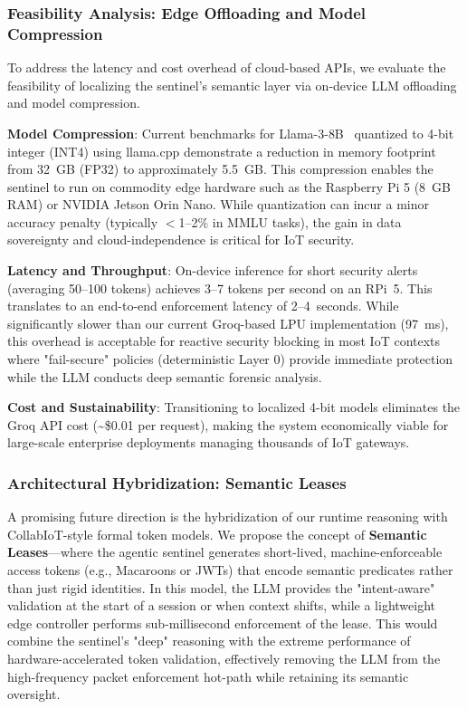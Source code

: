 \documentclass[conference]{IEEEtran}
\begin{document}
\subsubsection{Feasibility Analysis: Edge Offloading and Model Compression}

To address the latency and cost overhead of cloud-based APIs, we evaluate the feasibility of localizing the sentinel's semantic layer via on-device LLM offloading and model compression. 

\textbf{Model Compression}: Current benchmarks for Llama-3-8B~\cite{llama3} quantized to 4-bit integer (INT4) using llama.cpp demonstrate a reduction in memory footprint from 32~GB (FP32) to approximately 5.5~GB. This compression enables the sentinel to run on commodity edge hardware such as the Raspberry Pi 5 (8~GB RAM) or NVIDIA Jetson Orin Nano. While quantization can incur a minor accuracy penalty (typically $<$1–2\% in MMLU tasks), the gain in data sovereignty and cloud-independence is critical for IoT security.

\textbf{Latency and Throughput}: On-device inference for short security alerts (averaging 50--100 tokens) achieves 3--7 tokens per second on an RPi~5. This translates to an end-to-end enforcement latency of 2--4~seconds. While significantly slower than our current Groq-based LPU implementation (97~ms), this overhead is acceptable for reactive security blocking in most IoT contexts where "fail-secure" policies (deterministic Layer 0) provide immediate protection while the LLM conducts deep semantic forensic analysis.

\textbf{Cost and Sustainability}: Transitioning to localized 4-bit models eliminates the Groq API cost (\textasciitilde\$0.01 per request), making the system economically viable for large-scale enterprise deployments managing thousands of IoT gateways.

\subsubsection{Architectural Hybridization: Semantic Leases}

A promising future direction is the hybridization of our runtime reasoning with CollabIoT-style formal token models. We propose the concept of \textbf{Semantic Leases}—where the agentic sentinel generates short-lived, machine-enforceable access tokens (e.g., Macaroons or JWTs) that encode semantic predicates rather than just rigid identities. In this model, the LLM provides the "intent-aware" validation at the start of a session or when context shifts, while a lightweight edge controller performs sub-millisecond enforcement of the lease. This would combine the sentinel's "deep" reasoning with the extreme performance of hardware-accelerated token validation, effectively removing the LLM from the high-frequency packet enforcement hot-path while retaining its semantic oversight.
\end{document}
